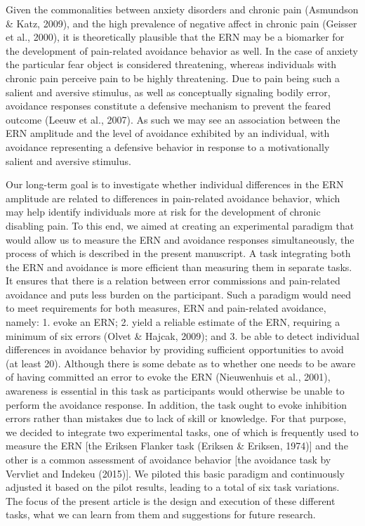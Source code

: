 \documentclass[twocolumn, serif, authordate, review]{jote-article}
\begin{document}
Given the commonalities between anxiety disorders and chronic pain (Asmundson \& Katz, 2009), and the high prevalence of negative affect in chronic pain (Geisser et al., 2000), it is theoretically plausible that the ERN may be a biomarker for the development of pain-related avoidance behavior as well. In the case of anxiety the particular fear object is considered threatening, whereas individuals with chronic pain perceive pain to be highly threatening. Due to pain being such a salient and aversive stimulus, as well as conceptually signaling bodily error, avoidance responses constitute a defensive mechanism to prevent the feared outcome (Leeuw et al., 2007). As such we may see an association between the ERN amplitude and the level of avoidance exhibited by an individual, with avoidance representing a defensive behavior in response to a motivationally salient and aversive stimulus.~

Our long-term goal is to investigate whether individual differences in the ERN amplitude are related to differences in pain-related avoidance behavior, which may help identify individuals more at risk for the development of chronic disabling pain. To this end, we aimed at creating an experimental paradigm that would allow us to measure the ERN and avoidance responses simultaneously, the process of which is described in the present manuscript. A task integrating both the ERN and avoidance is more efficient than measuring them in separate tasks. It ensures that there is a relation between error commissions and pain-related avoidance and puts less burden on the participant. Such a paradigm would need\textbf{ }to meet requirements for both measures, ERN and pain-related avoidance, namely: 1. evoke an ERN; 2. yield a reliable estimate of the ERN, requiring a minimum of six errors (Olvet \& Hajcak, 2009); and 3. be able to detect individual differences in avoidance behavior by providing sufficient opportunities to avoid (at least 20). Although there is some debate as to whether one needs to be aware of having committed an error to evoke the ERN (Nieuwenhuis et al., 2001), awareness is essential in this task as participants would otherwise be unable to perform the avoidance response. In addition, the task ought to evoke inhibition errors rather than mistakes due to lack of skill or knowledge. For that purpose, we decided to integrate two experimental tasks, one of which is frequently used to measure the ERN [the Eriksen Flanker task (Eriksen \& Eriksen, 1974)] and the other is a common assessment of avoidance behavior [the avoidance task by Vervliet and Indekeu (2015)]. We piloted this basic paradigm and continuously adjusted it based on the pilot results, leading to a total of six task variations. The focus of the present article is the design and execution of these different tasks, what we can learn from them and suggestions for future research.~
\end{document}
